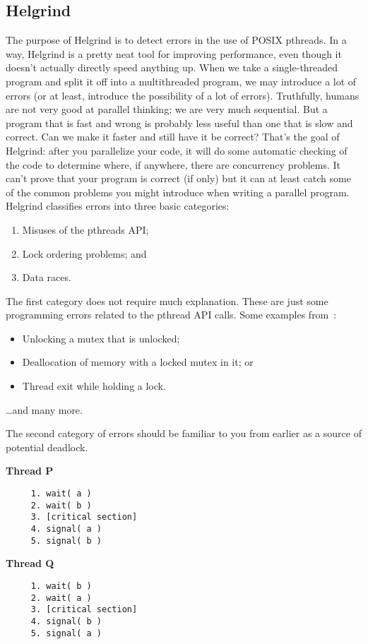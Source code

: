 \subsection*{Helgrind}
The purpose of Helgrind is to detect errors in the use of POSIX pthreads. In a way, Helgrind is a pretty neat tool for improving performance, even though it doesn't actually directly speed anything up. When we take a single-threaded program and split it off into a multithreaded program, we may introduce a lot of errors (or at least, introduce the possibility of a lot of errors). Truthfully, humans are not very good at parallel thinking; we are very much sequential. But a program that is fast and wrong is probably less useful than one that is slow and correct. Can we make it faster and still have it be correct? That's the goal of Helgrind: after you parallelize your code, it will do some automatic checking of the code to determine where, if anywhere, there are concurrency problems. It can't prove that your program is correct (if only) but it can at least catch some of the common problems you might introduce when writing a parallel program. Helgrind classifies errors into three basic categories:

\begin{enumerate}[noitemsep]
	\item Misuses of the pthreads API;
	\item Lock ordering problems; and
	\item Data races.
\end{enumerate}

The first category does not require much explanation. These are just some programming errors related to the pthread API calls. Some examples from~\cite{helgrind}:

\begin{itemize}[noitemsep]
	\item Unlocking a mutex that is unlocked;
	\item Deallocation of memory with a locked mutex in it; or
	\item Thread exit while holding a lock.
\end{itemize}
\ldots and many more.


The second category of errors should be familiar to you from earlier as a source of potential deadlock.

\begin{multicols}{2}
	\textbf{Thread P}\vspace{-2em}
	\begin{verbatim}
	 1. wait( a ) 
	 2. wait( b )
	 3. [critical section]
	 4. signal( a )
	 5. signal( b )
  \end{verbatim}
	\columnbreak
	\textbf{Thread Q}\vspace{-2em}
	\begin{verbatim}
	 1. wait( b ) 
	 2. wait( a )
	 3. [critical section]
	 4. signal( b )
	 5. signal( a )
  \end{verbatim}
\end{multicols}
\vspace{-2em}

